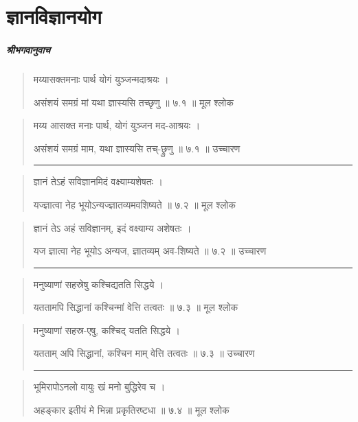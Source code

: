 \chapter{\sanskrit ज्ञानविज्ञानयोग}
\paragraph{\sanskrit श्रीभगवानुवाच}

\begin{quotation}
मय्यासक्तमनाः पार्थ योगं युञ्जन्मदाश्रयः  ।  

असंशयं समग्रं मां यथा ज्ञास्यसि तच्छृणु  ॥ ७.१ ॥  मूल श्लोक
\end{quotation}

\begin{quotation}
मय्य आसक्त मनाः पार्थ, योगं युञ्जन मद-आश्रयः  ।  

असंशयं समग्रं माम, यथा ज्ञास्यसि तच्-छ्रुणु  ॥ ७.१ ॥  उच्चारण

\noindent\rule{16cm}{0.4pt} 
\end{quotation}


\begin{quotation} 
ज्ञानं तेऽहं सविज्ञानमिदं वक्ष्याम्यशेषतः  ।  

यज्ज्ञात्वा नेह भूयोऽन्यज्ज्ञातव्यमवशिष्यते  ॥ ७.२ ॥  मूल श्लोक
\end{quotation}

\begin{quotation}
ज्ञानं तेऽ अहं सविज्ञानम्, इदं वक्ष्याम्य अशेषतः  ।  

यज ज्ञात्वा नेह भूयोऽ अन्यज, ज्ञातव्यम् अव-शिष्यते  ॥ ७.२ ॥  उच्चारण

\noindent\rule{16cm}{0.4pt} 
\end{quotation}


\begin{quotation} 
मनुष्याणां सहस्रेषु कश्चिद्यतति सिद्धये  ।  

यततामपि सिद्धानां कश्चिन्मां वेत्ति तत्वतः  ॥ ७.३ ॥  मूल श्लोक
\end{quotation}

\begin{quotation}
मनुष्याणां सहस्र-एषु, कश्चिद् यतति सिद्धये  ।  

यतताम् अपि सिद्धानां, कश्चिन माम् वेत्ति तत्वतः  ॥ ७.३ ॥  उच्चारण

\noindent\rule{16cm}{0.4pt} 
\end{quotation}


\begin{quotation} 
भूमिरापोऽनलो वायुः खं मनो बुद्धिरेव च  ।  

अहङ्‍कार इतीयं मे भिन्ना प्रकृतिरष्टधा  ॥ ७.४ ॥  मूल श्लोक
\end{quotation}

